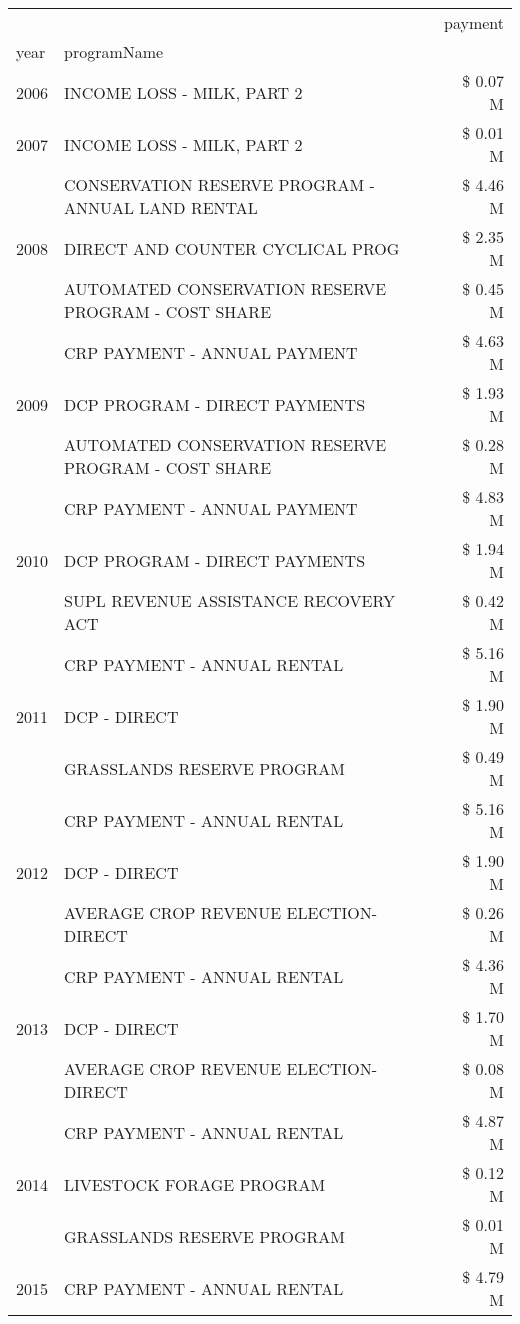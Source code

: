 \begin{tabular}{llr}
\toprule
 &  & payment \\
year & programName &  \\
\midrule
2006 & INCOME LOSS - MILK, PART 2 & \$ 0.07 M \\
\cline{1-3}
2007 & INCOME LOSS - MILK, PART 2 & \$ 0.01 M \\
\cline{1-3}
\multirow[t]{3}{*}{2008} & CONSERVATION RESERVE PROGRAM - ANNUAL LAND RENTAL & \$ 4.46 M \\
 & DIRECT AND COUNTER CYCLICAL PROG & \$ 2.35 M \\
 & AUTOMATED CONSERVATION RESERVE PROGRAM - COST SHARE & \$ 0.45 M \\
\cline{1-3}
\multirow[t]{3}{*}{2009} & CRP PAYMENT - ANNUAL PAYMENT & \$ 4.63 M \\
 & DCP PROGRAM - DIRECT PAYMENTS & \$ 1.93 M \\
 & AUTOMATED CONSERVATION RESERVE PROGRAM - COST SHARE & \$ 0.28 M \\
\cline{1-3}
\multirow[t]{3}{*}{2010} & CRP PAYMENT - ANNUAL PAYMENT & \$ 4.83 M \\
 & DCP PROGRAM - DIRECT PAYMENTS & \$ 1.94 M \\
 & SUPL REVENUE ASSISTANCE RECOVERY ACT & \$ 0.42 M \\
\cline{1-3}
\multirow[t]{3}{*}{2011} & CRP PAYMENT - ANNUAL RENTAL & \$ 5.16 M \\
 & DCP - DIRECT & \$ 1.90 M \\
 & GRASSLANDS RESERVE PROGRAM & \$ 0.49 M \\
\cline{1-3}
\multirow[t]{3}{*}{2012} & CRP PAYMENT - ANNUAL RENTAL & \$ 5.16 M \\
 & DCP - DIRECT & \$ 1.90 M \\
 & AVERAGE CROP REVENUE ELECTION-DIRECT & \$ 0.26 M \\
\cline{1-3}
\multirow[t]{3}{*}{2013} & CRP PAYMENT - ANNUAL RENTAL & \$ 4.36 M \\
 & DCP - DIRECT & \$ 1.70 M \\
 & AVERAGE CROP REVENUE ELECTION-DIRECT & \$ 0.08 M \\
\cline{1-3}
\multirow[t]{3}{*}{2014} & CRP PAYMENT - ANNUAL RENTAL & \$ 4.87 M \\
 & LIVESTOCK FORAGE PROGRAM & \$ 0.12 M \\
 & GRASSLANDS RESERVE PROGRAM & \$ 0.01 M \\
\cline{1-3}
\multirow[t]{3}{*}{2015} & CRP PAYMENT - ANNUAL RENTAL & \$ 4.79 M \\

\end{tabular}
